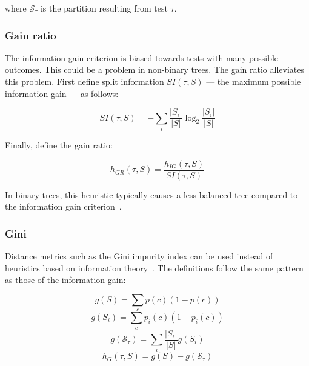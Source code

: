where $\mathcal{S}_\tau$ is the partition resulting from test $\tau$.

\subsubsection{Gain ratio}
The information gain criterion is biased towards tests with many possible outcomes. This could be a problem in non-binary trees. The gain ratio alleviates this problem. First define split information $SI(\tau, S)$ --- the maximum possible information gain --- as follows:

\begin{equation}
    SI(\tau, S) = - \sum_i \frac{|S_i|}{|S|} \log_2 \frac{|S_i|}{|S|}
\end{equation}

Finally, define the gain ratio:

\begin{equation}
    h_{GR}(\tau, S) = \frac{h_{IG}(\tau, S)}{SI(\tau, S)}
\end{equation}

In binary trees, this heuristic typically causes a less balanced tree compared to the information gain criterion~\cite{c45}.

\subsubsection{Gini}
Distance metrics such as the Gini impurity index can be used instead of heuristics based on information theory~\cite{cart}. The definitions follow the same pattern as those of the information gain:

\begin{equation}
    g(S) = \sum_c p(c)(1 - p(c))
\end{equation}
\begin{equation}
    g(S_i) = \sum_c p_i(c)(1-p_i(c))
\end{equation}
\begin{equation}
    g(\mathcal{S}_\tau) = \sum_i \frac{|S_i|}{|S|} g(S_i)
\end{equation}
\begin{equation}
    h_G(\tau, S) = g(S) - g(\mathcal{S}_\tau)
\end{equation}


